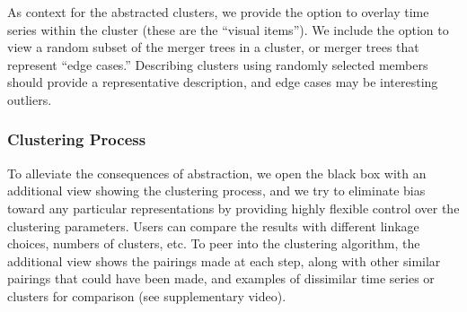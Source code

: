 As context for the abstracted clusters, we provide the option to overlay time series within the cluster (these are the ``visual items''). We include the option to view a random subset of the merger trees in a cluster, or merger trees that represent ``edge cases.'' Describing clusters using randomly selected members should provide a representative description, and edge cases may be interesting outliers.

\subsubsection{Clustering Process}


To alleviate the consequences of abstraction, we open the black box with an additional view showing the clustering process, and we try to eliminate bias toward any particular representations by providing highly flexible control over the clustering parameters. Users can compare the results with different linkage choices, numbers of clusters, etc. To peer into the clustering algorithm, the additional view shows the pairings made at each step, along with other similar pairings that could have been made, and examples of dissimilar time series or clusters for comparison (see supplementary video).



